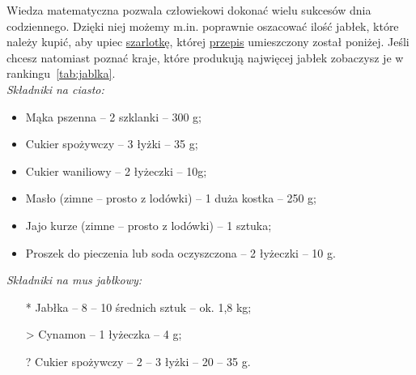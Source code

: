 Wiedza matematyczna pozwala człowiekowi dokonać wielu sukcesów dnia codziennego. Dzięki niej możemy m.in. poprawnie oszacować ilość jabłek, które należy kupić, aby upiec \underline{szarlotkę}, której \href{https://uczymyjakslodzic.pl/szarlotka-prosty-przepis-na-deser-idealny/#Prosta_szarlotka_na_kruchym_ciescie_-_nasz_sprawdzony_przepis}{przepis} umieszczony został poniżej. Jeśli chcesz natomiast poznać kraje, które produkują najwięcej jabłek zobaczysz je w rankingu~\ref{tab:jablka}.\\
\emph{Składniki na ciasto:}
\begin{itemize}
    \item Mąka pszenna – 2 szklanki – 300 g;
    \item Cukier spożywczy – 3 łyżki – 35 g;
    \item Cukier waniliowy – 2 łyżeczki – 10g;
    \item Masło (zimne – prosto z lodówki) – 1 duża kostka – 250 g;
    \item Jajo kurze (zimne – prosto z lodówki) – 1 sztuka;
    \item Proszek do pieczenia lub soda oczyszczona – 2 łyżeczki – 10 g.
\end{itemize}
\emph{Składniki na mus jabłkowy:}
\begin{itemize}
    \item[*] Jabłka – 8 – 10 średnich sztuk – ok. 1,8 kg;
    \item[>] Cynamon – 1 łyżeczka – 4 g;
    \item[?] Cukier spożywczy – 2 – 3 łyżki – 20 – 35 g.
\end{itemize}

